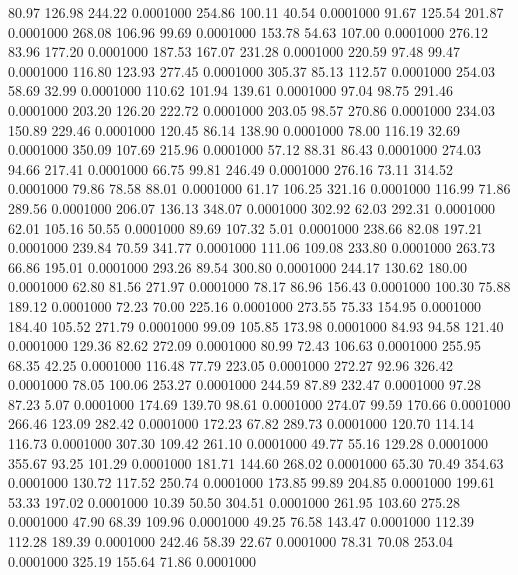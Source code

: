   80.97  126.98  244.22   0.0001000
 254.86  100.11   40.54   0.0001000
  91.67  125.54  201.87   0.0001000
 268.08  106.96   99.69   0.0001000
 153.78   54.63  107.00   0.0001000
 276.12   83.96  177.20   0.0001000
 187.53  167.07  231.28   0.0001000
 220.59   97.48   99.47   0.0001000
 116.80  123.93  277.45   0.0001000
 305.37   85.13  112.57   0.0001000
 254.03   58.69   32.99   0.0001000
 110.62  101.94  139.61   0.0001000
  97.04   98.75  291.46   0.0001000
 203.20  126.20  222.72   0.0001000
 203.05   98.57  270.86   0.0001000
 234.03  150.89  229.46   0.0001000
 120.45   86.14  138.90   0.0001000
  78.00  116.19   32.69   0.0001000
 350.09  107.69  215.96   0.0001000
  57.12   88.31   86.43   0.0001000
 274.03   94.66  217.41   0.0001000
  66.75   99.81  246.49   0.0001000
 276.16   73.11  314.52   0.0001000
  79.86   78.58   88.01   0.0001000
  61.17  106.25  321.16   0.0001000
 116.99   71.86  289.56   0.0001000
 206.07  136.13  348.07   0.0001000
 302.92   62.03  292.31   0.0001000
  62.01  105.16   50.55   0.0001000
  89.69  107.32    5.01   0.0001000
 238.66   82.08  197.21   0.0001000
 239.84   70.59  341.77   0.0001000
 111.06  109.08  233.80   0.0001000
 263.73   66.86  195.01   0.0001000
 293.26   89.54  300.80   0.0001000
 244.17  130.62  180.00   0.0001000
  62.80   81.56  271.97   0.0001000
  78.17   86.96  156.43   0.0001000
 100.30   75.88  189.12   0.0001000
  72.23   70.00  225.16   0.0001000
 273.55   75.33  154.95   0.0001000
 184.40  105.52  271.79   0.0001000
  99.09  105.85  173.98   0.0001000
  84.93   94.58  121.40   0.0001000
 129.36   82.62  272.09   0.0001000
  80.99   72.43  106.63   0.0001000
 255.95   68.35   42.25   0.0001000
 116.48   77.79  223.05   0.0001000
 272.27   92.96  326.42   0.0001000
  78.05  100.06  253.27   0.0001000
 244.59   87.89  232.47   0.0001000
  97.28   87.23    5.07   0.0001000
 174.69  139.70   98.61   0.0001000
 274.07   99.59  170.66   0.0001000
 266.46  123.09  282.42   0.0001000
 172.23   67.82  289.73   0.0001000
 120.70  114.14  116.73   0.0001000
 307.30  109.42  261.10   0.0001000
  49.77   55.16  129.28   0.0001000
 355.67   93.25  101.29   0.0001000
 181.71  144.60  268.02   0.0001000
  65.30   70.49  354.63   0.0001000
 130.72  117.52  250.74   0.0001000
 173.85   99.89  204.85   0.0001000
 199.61   53.33  197.02   0.0001000
  10.39   50.50  304.51   0.0001000
 261.95  103.60  275.28   0.0001000
  47.90   68.39  109.96   0.0001000
  49.25   76.58  143.47   0.0001000
 112.39  112.28  189.39   0.0001000
 242.46   58.39   22.67   0.0001000
  78.31   70.08  253.04   0.0001000
 325.19  155.64   71.86   0.0001000
